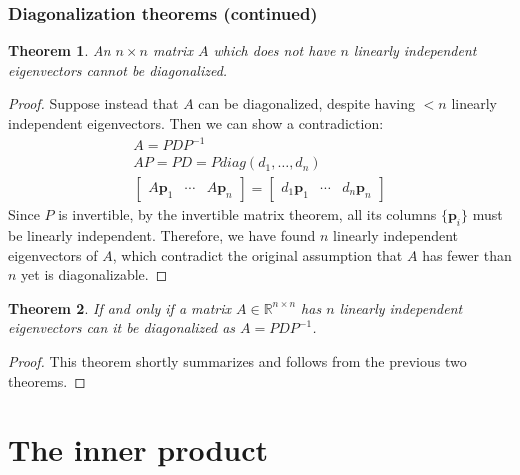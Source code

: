\documentclass[draft,12pt]{report}
\newtheorem{theorem}{Theorem}
\renewcommand{\vec}[1]{\mathbf{#1}}
\begin{document}
\subsubsection{Diagonalization theorems (continued)}

\begin{theorem}
    An $n \times n$ matrix $A$ which does not have $n$ linearly independent eigenvectors cannot be diagonalized.
\end{theorem}
\begin{proof}
    Suppose instead that $A$ can be diagonalized, despite having $< n$ linearly independent eigenvectors. Then we can show a contradiction:
    \begin{gather*}
        A = PDP^{-1} \\
        AP = PD = Pdiag(d_1, \ldots, d_n) \\
        \begin{bmatrix} A\vec{p}_1 & \cdots & A\vec{p}_n \end{bmatrix} = \begin{bmatrix} d_1\vec{p}_1 & \cdots & d_n\vec{p}_n \end{bmatrix}
    \end{gather*}
    Since $P$ is invertible, by the invertible matrix theorem, all its columns $\{ \vec{p}_i \}$ must be linearly independent. Therefore, we have found $n$ linearly independent eigenvectors of $A$, which contradict the original assumption that $A$ has fewer than $n$ yet is diagonalizable.
\end{proof}

\begin{theorem}
    If and only if a matrix $A \in \mathbb R^{n \times n}$ has $n$ linearly independent eigenvectors can it be diagonalized as $A = PDP^{-1}$.
\end{theorem}
\begin{proof}
    This theorem shortly summarizes and follows from the previous two theorems.
\end{proof}

\section{The inner product}
\end{document}
